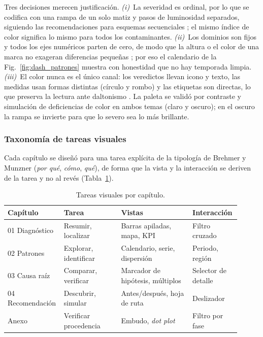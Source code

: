 \documentclass[journal,twocolumn,spanish]{IEEEtran}
\begin{document}
Tres decisiones merecen justificación. \emph{(i)}~La severidad es ordinal, por lo que se codifica con una rampa de un solo matiz y pasos de luminosidad separados, siguiendo las recomendaciones para esquemas secuenciales \cite{Harrower2003}; el mismo índice de color significa lo mismo para todos los contaminantes. \emph{(ii)}~Los dominios son fijos y todos los ejes numéricos parten de cero, de modo que la altura o el color de una marca no exageran diferencias pequeñas \cite{Tufte2001}; por eso el calendario de la Fig.~\ref{fig:dash_patrones} muestra con honestidad que no hay temporada limpia. \emph{(iii)}~El color nunca es el único canal: los veredictos llevan icono y texto, las medidas usan formas distintas (círculo y rombo) y las etiquetas son directas, lo que preserva la lectura ante daltonismo \cite{Ware2012}. La paleta se validó por contraste y simulación de deficiencias de color en ambos temas (claro y oscuro); en el oscuro la rampa se invierte para que lo severo sea lo más brillante.

\subsubsection*{Taxonomía de tareas visuales}
Cada capítulo se diseñó para una tarea explícita de la tipología de Brehmer y Munzner \cite{Brehmer2013} (\emph{por qué}, \emph{cómo}, \emph{qué}), de forma que la vista y la interacción se deriven de la tarea y no al revés (Tabla~\ref{tab:tareas}).

\begin{table}[htbp]
\caption{Tareas visuales por capítulo.}
\label{tab:tareas}
\centering
\footnotesize
\begin{tabular}{@{}p{0.17\linewidth}p{0.24\linewidth}p{0.30\linewidth}p{0.20\linewidth}@{}}
\toprule
Capítulo & Tarea & Vistas & Interacción \\
\midrule
01 Diagnóstico & Resumir, localizar & Barras apiladas, mapa, KPI & Filtro cruzado \\
02 Patrones & Explorar, identificar & Calendario, serie, dispersión & Periodo, región \\
03 Causa raíz & Comparar, verificar & Marcador de hipótesis, múltiplos & Selector de detalle \\
04 Recomendación & Descubrir, simular & Antes/después, hoja de ruta & Deslizador \\
Anexo & Verificar procedencia & Embudo, \emph{dot plot} & Filtro por fase \\
\bottomrule
\end{tabular}
\end{table}
\end{document}
